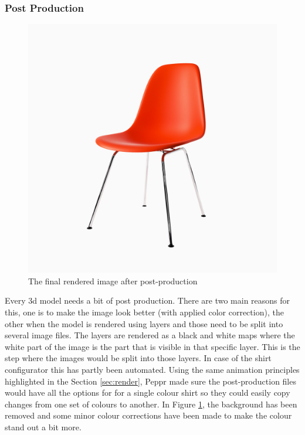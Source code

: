 \subsubsection{Post Production}
\begin{figure}
\centering
\includegraphics[width=16cm]{images/post}
\caption{The final rendered image after post-production}
\label{figure:post_production}
\end{figure}

Every 3d model needs a bit of post production. There are two main reasons for this, one is to make the image look better (with applied color correction), the other when the model is rendered using layers and those need to be split into several image files. The layers are rendered as a black and white maps where the white part of the image is the part that is visible in that specific layer. This is the step where the images would be split into those layers. In case of the shirt configurator this has partly been automated. Using the same animation principles highlighted in the Section \ref{sec:render}, Peppr made sure the post-production files would have all the options for for a single colour shirt so they could easily copy changes from one set of colours to another. In Figure \ref{figure:post_production}, the background has been removed and some minor colour corrections have been made to make the colour stand out a bit more.
\newline
